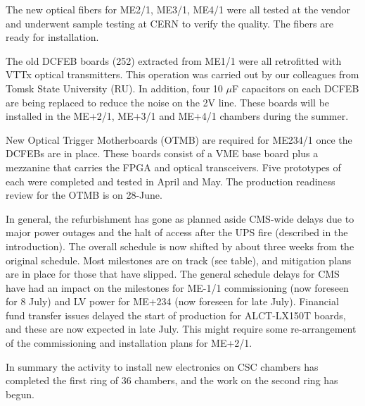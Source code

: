 \documentclass[12pt]{article}
\begin{document}
The new optical fibers for ME2/1, ME3/1, ME4/1 were all tested at the vendor and underwent sample testing at CERN to verify the quality.  The fibers are ready for installation. 

The old DCFEB boards (252) extracted from ME1/1 were all retrofitted with VTTx optical transmitters.  This operation was carried out by our colleagues from Tomsk State University (RU).  In addition, four 10 $\mu$F capacitors on each DCFEB are being replaced to reduce the noise on the 2V line. These boards will be installed in the ME+2/1, ME+3/1 and ME+4/1 chambers during the summer.

New Optical Trigger Motherboards (OTMB) are required for ME234/1 once the DCFEBs are in place.  These boards consist of a VME base board plus a mezzanine that carries the FPGA and optical transceivers.  Five prototypes of each were completed and tested in April and May.  The production readiness review for the OTMB is on 28-June.  

In general, the refurbishment has gone as planned aside CMS-wide delays due to major power outages and the halt of access after the UPS fire (described in the introduction).  The overall schedule is now shifted by about three weeks from the original schedule. Most milestones are on track (see table), and mitigation plans are in place for those that have slipped.  The general schedule delays for CMS have had an impact on the milestones for ME-1/1 commissioning (now foreseen for 8 July) and LV power for ME+234 (now foreseen for late July).  Financial fund transfer issues delayed the start of production for ALCT-LX150T boards, and these are now expected in late July.  This might require some re-arrangement of the commissioning and installation plans for ME+2/1.

In summary the activity to install new electronics on CSC chambers has completed the first ring of 36 chambers, and the work on the second ring has begun.
\end{document}
